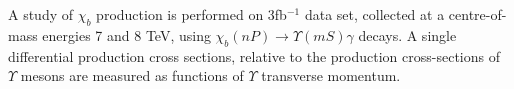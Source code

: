 A study of $\chi_b$ production is performed on 3fb$^{-1}$ data set, collected
at a centre-of-mass energies 7 and 8 TeV, using
$\chi_b(nP)\rightarrow\Upsilon(mS)\gamma$ decays. A single differential
production cross sections, relative to the production cross-sections of
$\Upsilon$ mesons are measured as functions of $\Upsilon$ transverse momentum.